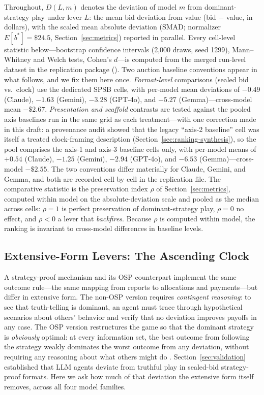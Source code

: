 Throughout, $D(L,m)$ denotes the deviation of model $m$ from
dominant-strategy play under lever $L$: the mean
bid deviation from value (bid $-$ value, in dollars), with the scaled mean
absolute deviation (SMAD; normalizer $E[b^{*}] = \$24.5$,
Section~\ref{sec:metrics}) reported in parallel. Every cell-level statistic
below---bootstrap confidence intervals (2{,}000 draws, seed 1299),
Mann--Whitney and Welch tests, Cohen's $d$---is computed from the merged
run-level dataset in the replication package
(). Two auction baseline conventions
appear in what follows, and we fix them here once. \emph{Format-level}
comparisons (sealed bid vs.\ clock) use the dedicated SPSB cells, with
per-model mean deviations of $-0.49$ (Claude), $-1.63$ (Gemini), $-3.28$
(GPT-4o), and $-5.27$ (Gemma)---cross-model mean $-\$2.67$.
\emph{Presentation and scaffold} contrasts are tested against the pooled
axis baselines run in the same grid as each treatment---with one correction
made in this draft: a provenance audit showed that the legacy ``axis-2
baseline'' cell was itself a treated clock-framing description
(Section~\ref{sec:ranking-synthesis}), so the pool comprises the axis-1 and
axis-3 baseline cells only, with per-model means of $+0.54$ (Claude),
$-1.25$ (Gemini), $-2.94$ (GPT-4o), and $-6.53$ (Gemma)---cross-model
$-\$2.55$. The two conventions differ materially for Claude, Gemini, and
Gemma, and both are recorded cell by cell in the replication file. The comparative statistic is the preservation index
$\rho$ of Section~\ref{sec:metrics}, computed within model on
the absolute-deviation scale and pooled as the median across cells:
$\rho = 1$ is perfect preservation of dominant-strategy play, $\rho = 0$ no
effect, and $\rho < 0$ a lever that \emph{backfires}. Because $\rho$ is
computed within model, the ranking is invariant to cross-model differences in
baseline levels.

\subsection{Extensive-Form Levers: The Ascending Clock}
\label{sec:ranking-extensive}

A strategy-proof mechanism and its OSP counterpart implement the same outcome
rule---the same mapping from reports to allocations and payments---but differ
in extensive form. The non-OSP version requires \emph{contingent reasoning}:
to see that truth-telling is dominant, an agent must trace through
hypothetical scenarios about others' behavior and verify that no deviation
improves payoffs in any case. The OSP version restructures the game so that
the dominant strategy is \emph{obviously} optimal: at every information set,
the best outcome from following the strategy weakly dominates the worst
outcome from any deviation, without requiring any reasoning about what others
might do \citep{li2017obviously}. Section~\ref{sec:validation} established
that LLM agents deviate from truthful play in sealed-bid strategy-proof
formats. Here we ask how much of that deviation the extensive form itself
removes, across all four model families.

